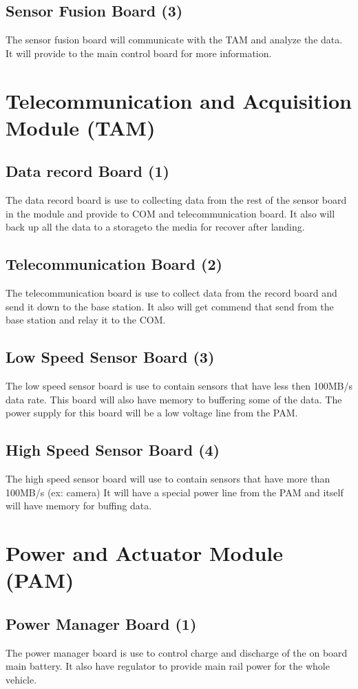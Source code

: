 \documentclass[12pt,article]{memoir}
\begin{document}
\subsection{Sensor Fusion Board (3)}
The sensor fusion board will communicate with the TAM and analyze the data. It will provide to the main control board for more information.
\section{Telecommunication and Acquisition Module (TAM)}
\subsection{Data record Board (1)}
The data record board is use to collecting data from the rest of the sensor board in the module and provide to COM and telecommunication board. It also will back up all the data to a storageto the media for recover after landing.
\subsection{Telecommunication Board (2)}
The telecommunication board is use to collect data from the record board and send it down to the base station. It also will get commend that send from the base station and relay it to the COM.
\subsection{Low Speed Sensor Board (3)}
The low speed sensor board is use to contain sensors that have less then 100MB/s data rate. This board will also have memory to buffering some of the data. The power supply for this board will be a low voltage line from the PAM.
\subsection{High Speed Sensor Board (4)}
The high speed sensor board will use to contain sensors that have more than 100MB/s (ex: camera) It will have a special power line from the PAM and itself will have memory for buffing data.
\section{Power and Actuator Module (PAM)}
\subsection{Power Manager Board (1)}
The power manager board is use to control charge and discharge of the on board main battery. It also have regulator to provide main rail power for the whole vehicle.
\end{document}
